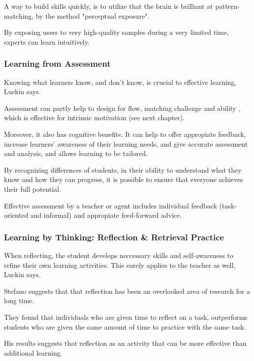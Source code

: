   A way to build skills quickly, is to utilize that the brain is brilliant at pattern-matching, by the method "perceptual exposure". \cite{sierra}

  By exposing users to very high-quality samples during a very limited time, experts can learn intuitively.

  \subsubsection{Learning from Assessment}

  Knowing what learners know, and don't know, is crucial to effective learning, Luckin \cite{luckin} says.

  Assessment can partly help to design for flow, matching challenge and ability \cite{bruhlmann}, which is effective for intrinsic motivation (see next chapter).

  Moreover, it also has cognitive benefits. It can help to offer appropiate feedback, increase learners' awareness of their learning needs, and give accurate assessment and analysis, and allows learning to be tailored.

  By recognizing differences of students, in their ability to understand what they know and how they can progress, it is possible to ensure that everyone achieves their full potential.

  Effective assessment by a teacher or agent includes individual feedback (task-oriented and informal) and appropiate feed-forward advice.

  \subsubsection{Learning by Thinking: Reflection \& Retrieval Practice}

  When reflecting, the student develops neccessary skills and self-awareness to refine their own learning activities. This surely applies to the teacher as well, Luckin says. \cite{luckin}

  Stefano \cite{stefano} suggests that that reflection has been an overlooked area of research for a long time.

  They found that individuals who are given time to reflect on a task, outperforms students who are given the same amount of time to practice with the same task.

  His results suggests that reflection as an activity that can be more effective than additional learning.

